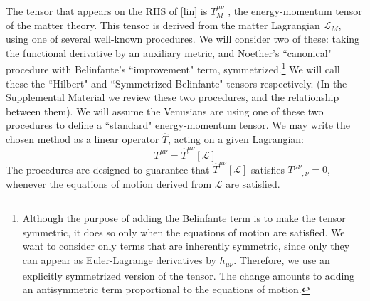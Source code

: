 \documentclass[aps,physrev,preprint,groupedaddress]{revtex4-2}
\begin{document}
The tensor that appears on the RHS of \eqref{lin} is \(T_{M}^{\mu\nu}\) , the energy-momentum tensor of the matter theory. This tensor is derived from the matter Lagrangian \(\mathcal{L}_{M}\), using one of several well-known procedures. We will consider two of these: taking the functional derivative by an auxiliary metric, and Noether's ``canonical" procedure with Belinfante's ``improvement" term, symmetrized.\footnote{Although the purpose of adding the Belinfante term is to make the tensor symmetric, it does so only when the equations of motion are satisfied. We want to consider only terms that are inherently symmetric, since only they can appear as Euler-Lagrange derivatives by \(h_{\mu\nu}\). Therefore, we use an explicitly symmetrized version of the tensor. The change amounts to adding an antisymmetric term proportional to the equations of motion.} We will call these the ``Hilbert" and ``Symmetrized Belinfante" tensors respectively. (In the Supplemental Material we review these two procedures, and the relationship between them). We will assume the Venusians are using one of these two procedures to define a ``standard" energy-momentum tensor. We may write the chosen method as a linear operator \(\widehat{T}\), acting on a given Lagrangian:
\begin{equation}
    T^{\mu\nu}={\widehat{T}}^{\mu\nu}\left\lbrack \mathcal{L} \right\rbrack
\end{equation}
The procedures are designed to guarantee that \({\widehat{T}}^{\mu\nu}\left\lbrack \mathcal{L} \right\rbrack\) satisfies \(T^{\mu\nu}{}_{,\nu} = 0\), whenever the equations of motion derived from \( \mathcal{L}\) are satisfied. 
\end{document}
